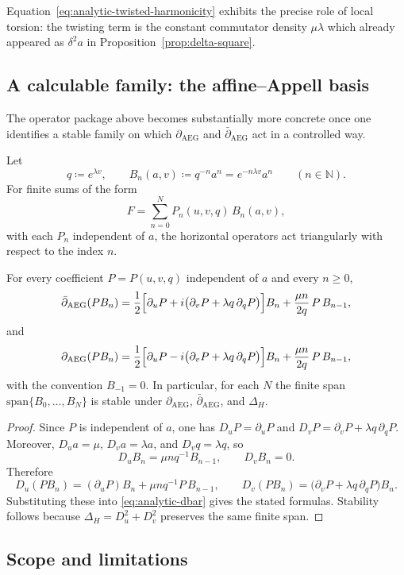 Equation~\eqref{eq:analytic-twisted-harmonicity} exhibits the precise role of local torsion: the twisting term is the constant commutator density $\mu\lambda$ which already appeared as $\delta^2a$ in Proposition~\ref{prop:delta-square}.

\subsection{A calculable family: the affine--Appell basis}\label{subsec:analytic-affine-appell}
The operator package above becomes substantially more concrete once one identifies a stable family on which $\partial_{\mathrm{AEG}}$ and $\bar\partial_{\mathrm{AEG}}$ act in a controlled way.

Let
\[
q\coloneqq e^{\lambda v},
\qquad
B_n(a,v)\coloneqq q^{-n}a^n=e^{-n\lambda v}a^n
\qquad (n\in\mathbb{N}).
\]
For finite sums of the form
\[
F=\sum_{n=0}^N P_n(u,v,q)\,B_n(a,v),
\]
with each $P_n$ independent of $a$, the horizontal operators act triangularly with respect to the index $n$.

\begin{proposition}\label{prop:analytic-affine-appell-operators}
For every coefficient $P=P(u,v,q)$ independent of $a$ and every $n\ge 0$,
\[
\bar\partial_{\mathrm{AEG}}(PB_n)
=
\frac12\Bigl[\partial_uP+i\bigl(\partial_vP+\lambda q\,\partial_qP\bigr)\Bigr]B_n
+
\frac{\mu n}{2q}\,P\,B_{n-1},
\]
and
\[
\partial_{\mathrm{AEG}}(PB_n)
=
\frac12\Bigl[\partial_uP-i\bigl(\partial_vP+\lambda q\,\partial_qP\bigr)\Bigr]B_n
+
\frac{\mu n}{2q}\,P\,B_{n-1},
\]
with the convention $B_{-1}=0$. In particular, for each $N$ the finite span $\mathrm{span}\{B_0,\dots,B_N\}$ is stable under $\partial_{\mathrm{AEG}}$, $\bar\partial_{\mathrm{AEG}}$, and $\Delta_H$.
\end{proposition}

\begin{proof}
Since $P$ is independent of $a$, one has $D_uP=\partial_uP$ and $D_vP=\partial_vP+\lambda q\,\partial_qP$. Moreover, $D_u a=\mu$, $D_v a=\lambda a$, and $D_vq=\lambda q$, so
\[
D_uB_n=\mu n q^{-1}B_{n-1},
\qquad
D_vB_n=0.
\]
Therefore
\[
D_u(PB_n)=(\partial_uP)B_n+\mu n q^{-1}P\,B_{n-1},
\qquad
D_v(PB_n)=\bigl(\partial_vP+\lambda q\,\partial_qP\bigr)B_n.
\]
Substituting these into \eqref{eq:analytic-dbar} gives the stated formulas. Stability follows because $\Delta_H=D_u^2+D_v^2$ preserves the same finite span.
\end{proof}

\subsection{Scope and limitations}\label{subsec:analytic-scope}


